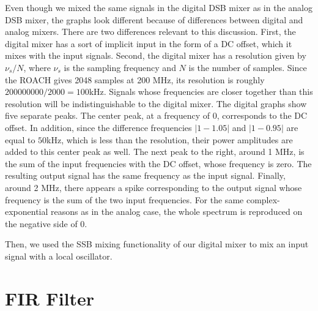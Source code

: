 \documentclass[11pt]{article}
\begin{document}
Even though we mixed the same signals in the digital DSB mixer as in the analog DSB mixer, the graphs look different because of differences between digital and analog mixers. There are two differences relevant to this discussion. First, the digital mixer has a sort of implicit input in the form of a DC offset, which it mixes with the input signals. Second, the digital mixer has a resolution given by $\nu_s / N$, where $\nu_s$ is the sampling frequency and $N$ is the number of samples. Since the ROACH gives 2048 samples at 200 MHz, its resolution is roughly $200000000/2000 = 100$kHz. Signals whose frequencies are closer together than this resolution will be indistinguishable to the digital mixer. The digital graphs show five separate peaks. The center peak, at a frequency of 0, corresponds to the DC offset. In addition, since the difference frequencies $|1 - 1.05|$ and $|1 - 0.95|$ are equal to $50$kHz, which is less than the resolution, their power amplitudes are added to this center peak as well. The next peak to the right, around 1 MHz, is the sum of the input frequencies with the DC offset, whose frequency is zero. The resulting output signal has the same frequency as the input signal. Finally, around 2 MHz, there appears a spike corresponding to the output signal whose frequency is the sum of the two input frequencies. For the same complex-exponential reasons as in the analog case, the whole spectrum is reproduced on the negative side of 0.

Then, we used the SSB mixing functionality of our digital mixer to mix an input signal %
with a local oscillator. %

\section{FIR Filter}
\end{document}

